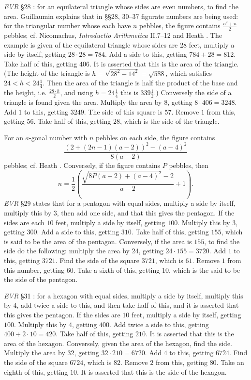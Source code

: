\documentclass{article}
\theoremstyle{definition}
\begin{document}
{\em EVR} \S 28 \cite[pp.~158--163]{guillaumin}: for an equilateral triangle whose sides are even numbers,
to find the area. Guillaumin explains that in \S \S 28, 30--37 
figurate numbers are being used:
for the triangular number whose each have $n$ pebbles, the figure contains $\frac{n^2+n}{2}$ pebbles; cf.
Nicomachus, {\em Introductio Arithmetica} II.7--12 \cite[pp~239--249]{nicomachus} and Heath \cite[p.~76]{HGMI}. 
The example is given of the equilateral triangle whose sides are $28$ feet, 
multiply a side by itself, getting $28\cdot 28=784$. Add a side to this, getting $784+28=812$. Take half of this, getting $406$. It is asserted that this
is the area of the triangle. (The height of the triangle is $h=\sqrt{28^2-14^2}=\sqrt{588}$, which satisfies $24<h<24 \frac{1}{4}$. 
Then the area of the triangle is half the product of the base and the height, i.e. $\frac{28\cdot h}{2}$, and using $h=24 \frac{1}{4}$ this is
$339 \frac{1}{2}$.)
Conversely the side of a triangle is found given the area.
Multiply the area by $8$, getting $8\cdot 406 = 3248$. Add $1$ to this, getting $3249$. The side of this square is 
$57$. Remove $1$ from this, getting $56$. Take half of this, getting $28$, which is the side of the triangle. 

For an $a$-gonal number with $n$ pebbles on each side, the figure contains 
\[
\frac{(2+(2n-1)(a-2))^2-(a-4)^2}{8(a-2)}
\]
pebbles; cf. Heath \cite[p.~516]{HGMII}.
Conversely, if the figure contains $P$ pebbles, then
\[
n=\frac{1}{2}\left( \frac{\sqrt{8P(a-2)+(a-4)^2}-2}{a-2}+1\right).
\]
{\em EVR} \S 29 \cite[pp.~164--167]{guillaumin} states that for a pentagon with equal sides, multiply a side by itself,
multiply this by $3$, then add one side, and that this gives the pentagon. If the sides are each $10$ feet, multiply
a side by itself, getting $100$. Multiply this by $3$, getting $300$. Add a side to this, getting $310$. Take
half of this, getting $155$, which is said to be the area of the pentagon. 
Conversely, if the area is $155$, to find the side do the following: multiply the area by $24$, getting
$24 \cdot 155 = 3720$. Add $1$ to this, getting $3721$. Find the side of the square $3721$, which is $61$. 
Remove $1$ from this number, getting $60$. Take a sixth of this, getting $10$, which is the said to be the side of the
pentagon.

{\em EVR} \S 31 \cite[pp.~172--177]{guillaumin}: for a hexagon with equal sides, multiply
a side by itself, multiply this by $4$, add twice a side to this, and then take half of this, and it is asserted
that this gives the pentagon. If the sides are $10$ feet, multiply a side by itself, getting $100$. 
Multiply this by $4$, getting $400$. Add twice a side to this, getting $400+2\cdot 10=420$. Take half
of this, getting $210$. It is asserted that this is the area of the hexagon. Conversely,
given the area of the hexagon, find the side. Multiply the area by $32$, getting $32 \cdot 210 = 6720$.
Add $4$ to this, getting $6724$. Find the side of the square $6724$, which is $82$. Remove $2$ from this,
getting $80$. Take an eighth of this, getting $10$. It is asserted that this is the side of the hexagon.
\end{document}
